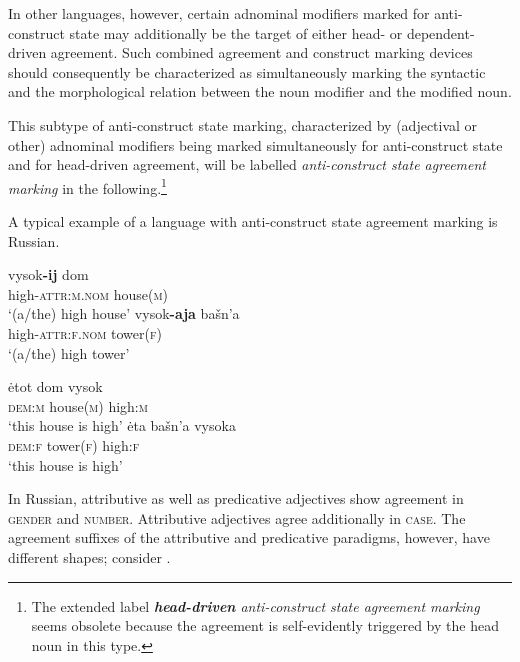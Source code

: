 In other languages, however, certain adnominal modifiers marked for anti-construct state may additionally be the target of either head- or dependent-driven agreement. Such combined agreement and construct marking devices should consequently be characterized as simultaneously marking the syntactic and the morphological relation between the noun modifier and the modified noun. 

This subtype of anti-construct state marking, characterized by (adjectival or other) adnominal modifiers being marked simultaneously for anti-construct state and for head-driven agreement, will be labelled \emph{anti-construct state agreement marking} in the following.\footnote{The extended label \emph{\textbf{head-driven} anti-construct state agreement marking} seems obsolete because the agreement is self-evidently triggered by the head noun in this type.} %

A typical example of a language with anti-construct state agreement marking is Russian.
\begin{exe}
\ex
{} \label{ru-anti}
\begin{xlist}
\begin{xlist}
\ex
\gll 	vysok\textbf{-ij} 			dom\\
	high-\textsc{attr:m.nom} house(\textsc{m})\\
\glt	 ‘(a/the) high house’
\ex
\gll 	vysok\textbf{-aja} 			bašn'a\\
	high-\textsc{attr:f.nom} tower(\textsc{f})\\
\glt	 ‘(a/the) high tower’
\end{xlist}
\begin{xlist}
\ex 
\gll 	\.etot 	dom	vysok\\
	\textsc{dem:m} house(\textsc{m}) 	high:\textsc{m}\\
\glt	 ‘this house is high’
\ex
\gll 	\.eta 	bašn'a	vysoka\\
	\textsc{dem:f} tower(\textsc{f}) 	high:\textsc{f}\\
\glt	 ‘this house is high’
\end{xlist}
\end{xlist}
\end{exe}
In Russian, attributive as well as predicative adjectives show agreement in \textsc{gender} and \textsc{number}. Attributive adjectives agree additionally in \textsc{case}. The agreement suffixes of the attributive and predicative paradigms, however, have different shapes; consider .

